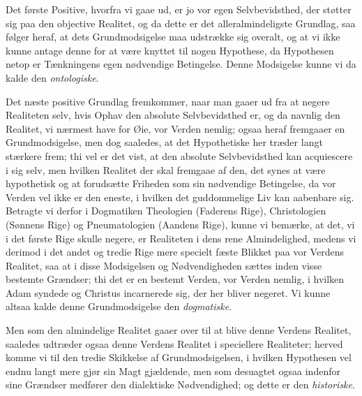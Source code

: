 \documentclass[12pt]{book}
\newcommand{\opage}[1]{\marginnote{\footnotesize\textit{[#1]}}}
\begin{document}
Det første Positive, hvorfra vi gaae ud, er jo vor egen Selvbevidsthed, der
støtter sig paa den objective Realitet, og da dette er det alleralmindeligste
Grundlag, saa følger heraf, at dets Grundmodsigelse maa udstrække sig overalt,
og at vi ikke kunne antage denne for at være knyttet til nogen Hypothese, da
Hypothesen netop er Tænkningens egen nødvendige Betingelse. Denne Modsigelse
kunne vi da kalde den \emph{ontologiske}.

\opage{41} Det næste positive Grundlag fremkommer, naar man gaaer ud fra at negere
Realiteten selv, hvis Ophav den absolute Selvbevidsthed er, og da navnlig den
Realitet, vi nærmest have for Øie, vor Verden nemlig; ogsaa heraf fremgaaer en
Grundmodsigelse, men dog saaledes, at det Hypothetiske her træder langt
stærkere frem; thi vel er det vist, at den absolute Selvbevidsthed kan
acquiescere i sig selv, men hvilken Realitet der skal fremgaae af den, det
synes at være hypothetisk og at forudsætte Friheden som sin nødvendige
Betingelse, da vor Verden vel ikke er den eneste, i hvilken det guddommelige
Liv kan aabenbare sig. Betragte vi derfor i Dogmatiken Theologien (Faderens
Rige), Christologien (Sønnens Rige) og Pneumatologien (Aandens Rige), kunne vi
bemærke, at det, vi i det første Rige skulle negere, er Realiteten i dens rene
Almindelighed, medens vi derimod i det andet og tredie Rige mere specielt fæste
Blikket paa vor Verdens Realitet, saa at i disse Modsigelsen og Nødvendigheden
sættes inden visse bestemte Grændser; thi det er en bestemt Verden, vor Verden
nemlig, i hvilken Adam syndede og Christus incarnerede sig, der her bliver
negeret. Vi kunne altsaa kalde denne Grundmodsigelse den \emph{dogmatiske}.

Men som den almindelige Realitet gaaer over til at blive denne Verdens
Realitet, saaledes udtræder ogsaa denne Verdens Realitet i speciellere
Realiteter; herved komme vi til den tredie Skikkelse af Grundmodsigelsen, i
hvilken Hypothesen vel endnu langt mere gjør sin Magt gjældende, men som
desuagtet ogsaa indenfor sine Grændser medfører den dialektiske Nødvendighed;
og dette er den \emph{historiske}.
\end{document}
